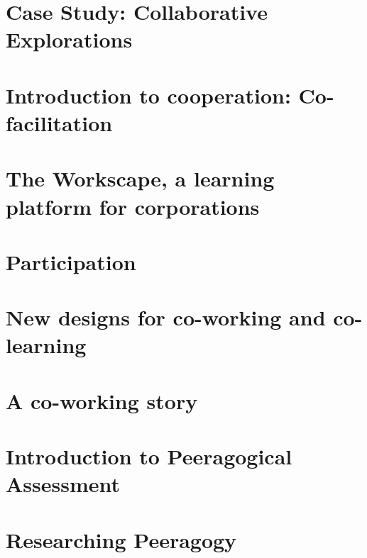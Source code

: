 \documentclass[nols,nobib]{tufte-book}
\begin{document}
\chapter[\textbf{Case Study: Collaborative Explorations}]{ Case Study: Collaborative Explorations}
%


%
\chapter[\textbf{Co-facilitation}]{Introduction to cooperation: Co-facilitation}

%
\chapter[\textbf{The Workscape}]{ The Workscape, a learning platform for corporations }
%

\chapter[\textbf{Participation}]{ Participation }
%

%
\chapter[\textbf{Designs for co-working}]{New designs for co-working and co-learning}
%

%
\chapter[\textbf{A co-working story}]{A co-working story}
%



%
\chapter[\textbf{Peeragogical Assessment}]{Introduction to Peeragogical Assessment}

%
\chapter[\textbf{Researching Peeragogy}]{Researching Peeragogy}
%

\end{document}
